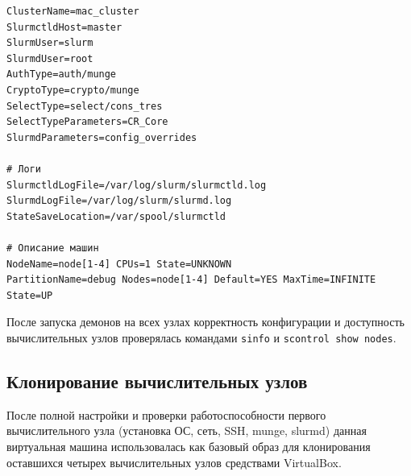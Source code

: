 \begin{lstlisting}[caption={Фрагмент файла slurm.conf}]
ClusterName=mac_cluster
SlurmctldHost=master
SlurmUser=slurm
SlurmdUser=root
AuthType=auth/munge
CryptoType=crypto/munge
SelectType=select/cons_tres
SelectTypeParameters=CR_Core
SlurmdParameters=config_overrides

# Логи
SlurmctldLogFile=/var/log/slurm/slurmctld.log
SlurmdLogFile=/var/log/slurm/slurmd.log
StateSaveLocation=/var/spool/slurmctld

# Описание машин
NodeName=node[1-4] CPUs=1 State=UNKNOWN
PartitionName=debug Nodes=node[1-4] Default=YES MaxTime=INFINITE State=UP
\end{lstlisting}

После запуска демонов на всех узлах корректность конфигурации и
доступность вычислительных узлов проверялась командами
\texttt{sinfo} и \texttt{scontrol show nodes}.


\subsection{Клонирование вычислительных узлов}

После полной настройки и проверки работоспособности первого
вычислительного узла (установка ОС, сеть, SSH, munge, slurmd) данная
виртуальная машина использовалась как базовый образ для клонирования
оставшихся четырех вычислительных узлов средствами VirtualBox.
